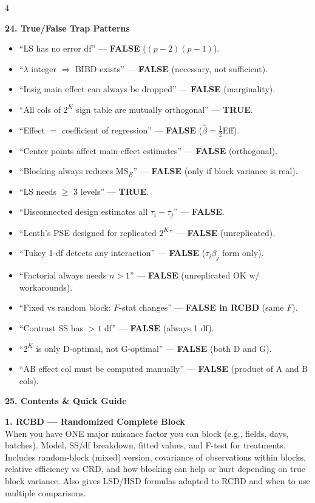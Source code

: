 \documentclass[7pt,letterpaper,landscape]{extarticle}
\newcommand{\secbar}[1]{%
  \vspace{2pt}%
  {\colorbox{black!80}{\parbox{\dimexpr\linewidth-2\fboxsep}{\color{white}\small\bfseries #1}}}\par%
  \vspace{1pt}%
}
\newcommand{\MSE}{\mathrm{MS}_E}
\begin{document}
\begin{multicols*}{4}
\secbar{24. True/False Trap Patterns}
{\scriptsize
\begin{itemize}[leftmargin=10pt]
\item ``LS has no error df'' — \textbf{FALSE} ($(p{-}2)(p{-}1)$).
\item ``$\lambda$ integer $\Rightarrow$ BIBD exists'' — \textbf{FALSE} (necessary, not sufficient).
\item ``Insig main effect can always be dropped'' — \textbf{FALSE} (marginality).
\item ``All cols of $2^K$ sign table are mutually orthogonal'' — \textbf{TRUE}.
\item ``Effect $=$ coefficient of regression'' — \textbf{FALSE} ($\hat\beta{=}\tfrac12$Eff).
\item ``Center points affect main-effect estimates'' — \textbf{FALSE} (orthogonal).
\item ``Blocking always reduces $\MSE$'' — \textbf{FALSE} (only if block variance is real).
\item ``LS needs $\ge$ 3 levels'' — \textbf{TRUE}.
\item ``Disconnected design estimates all $\tau_i{-}\tau_j$'' — \textbf{FALSE}.
\item ``Lenth's PSE designed for replicated $2^K$'' — \textbf{FALSE} (unreplicated).
\item ``Tukey 1-df detects any interaction'' — \textbf{FALSE} ($\tau_i\beta_j$ form only).
\item ``Factorial always needs $n{>}1$'' — \textbf{FALSE} (unreplicated OK w/ workarounds).
\item ``Fixed vs random block: $F$-stat changes'' — \textbf{FALSE in RCBD} (same $F$).
\item ``Contrast SS has $>1$ df'' — \textbf{FALSE} (always 1 df).
\item ``$2^K$ is only D-optimal, not G-optimal'' — \textbf{FALSE} (both D and G).
\item ``AB effect col must be computed manually'' — \textbf{FALSE} (product of A and B cols).
\end{itemize}
\par}

\secbar{25. Contents \& Quick Guide}
{\scriptsize
\textbf{1. RCBD — Randomized Complete Block}\\
When you have ONE major nuisance factor you can block (e.g., fields, days, batches). Model, SS/df breakdown, fitted values, and F-test for treatments. Includes random-block (mixed) version, covariance of observations within blocks, relative efficiency vs CRD, and how blocking can help or hurt depending on true block variance. Also gives LSD/HSD formulas adapted to RCBD and when to use multiple comparisons.

}
\end{multicols*}
\end{document}
